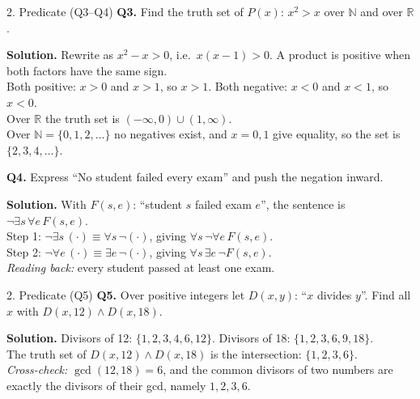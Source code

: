 \documentclass[aspectratio=169,10pt]{beamer}
\newcommand{\qa}[3]{%
  \textbf{Q#1.} #2\par\smallskip
  {\color{ans}\textbf{Solution.} #3}\par\vspace{6pt}}
\begin{document}
\begin{frame}{2. Predicate (Q3--Q4)}
\footnotesize
\qa{3}{Find the truth set of $P(x)$: $x^2>x$ over $\mathbb{N}$ and over $\mathbb{R}$.}
{Rewrite as $x^2-x>0$, i.e.\ $x(x-1)>0$. A product is positive when both factors have the same sign.\\
Both positive: $x>0$ and $x>1$, so $x>1$. Both negative: $x<0$ and $x<1$, so $x<0$.\\
Over $\mathbb{R}$ the truth set is $(-\infty,0)\cup(1,\infty)$.\\
Over $\mathbb{N}=\{0,1,2,\dots\}$ no negatives exist, and $x=0,1$ give equality, so the set is $\{2,3,4,\dots\}$.}
\qa{4}{Express ``No student failed every exam'' and push the negation inward.}
{With $F(s,e)$: ``student $s$ failed exam $e$'', the sentence is $\neg\exists s\,\forall e\,F(s,e)$.\\
Step 1: $\neg\exists s\,(\cdot)\equiv\forall s\,\neg(\cdot)$, giving $\forall s\,\neg\forall e\,F(s,e)$.\\
Step 2: $\neg\forall e\,(\cdot)\equiv\exists e\,\neg(\cdot)$, giving $\forall s\,\exists e\,\neg F(s,e)$.\\
\emph{Reading back:} every student passed at least one exam.}
\end{frame}

\begin{frame}{2. Predicate (Q5)}
\footnotesize
\qa{5}{Over positive integers let $D(x,y)$: ``$x$ divides $y$''. Find all $x$ with $D(x,12)\land D(x,18)$.}
{Divisors of 12: $\{1,2,3,4,6,12\}$. Divisors of 18: $\{1,2,3,6,9,18\}$.\\
The truth set of $D(x,12)\land D(x,18)$ is the intersection: $\{1,2,3,6\}$.\\
\emph{Cross-check:} $\gcd(12,18)=6$, and the common divisors of two numbers are exactly the divisors of their gcd, namely $1,2,3,6$.}
\end{frame}
\end{document}
